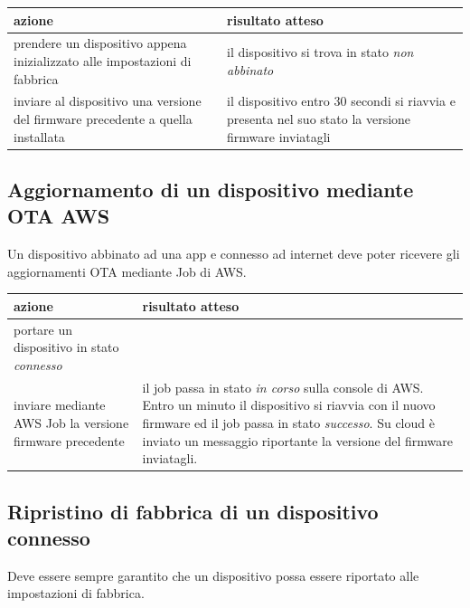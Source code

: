 \documentclass[12pt,a4paper,twoside,titlepage]{book}
\begin{document}
\begin{center}
\begin{tabular}{| p{5cm} | p{5cm} |}
    \hline \textbf{azione} & \textbf{risultato atteso} \\
    \hline prendere un dispositivo appena inizializzato alle impostazioni di fabbrica & il dispositivo si trova in stato \textit{non abbinato} \\
    \hline inviare al dispositivo una versione del firmware precedente a quella installata & il dispositivo entro 30 secondi si riavvia e presenta nel suo stato la versione firmware inviatagli \\
    \hline
\end{tabular}
\end{center}

\subsection{Aggiornamento di un dispositivo mediante OTA AWS}

Un dispositivo abbinato ad una app e connesso ad internet deve poter ricevere gli
aggiornamenti OTA mediante Job di AWS.

\begin{center}
\begin{tabular}{| p{5cm} | p{5cm} |}
    \hline \textbf{azione} & \textbf{risultato atteso} \\
    \hline portare un dispositivo in stato \textit{connesso} & \\
    \hline inviare mediante AWS Job la versione firmware precedente & il job passa in stato \textit{in corso} sulla console di AWS. Entro un minuto il dispositivo si riavvia con il nuovo firmware ed il job passa in stato \textit{successo}. Su cloud è inviato un messaggio riportante la versione del firmware inviatagli. \\
    \hline
\end{tabular}
\end{center}

\subsection{Ripristino di fabbrica di un dispositivo connesso}
Deve essere sempre garantito che un dispositivo possa essere riportato alle impostazioni di fabbrica.
\end{document}
